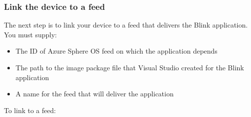 \subsubsection{Link the device to a feed}
The next step is to link your device to a feed that delivers the Blink application. You must supply:
\begin{itemize}
    \item The ID of Azure Sphere OS feed on which the application depends
    \item The path to the image package file that Visual Studio created for the Blink application
    \item A name for the feed that will deliver the application
\end{itemize}

To link to a feed:


